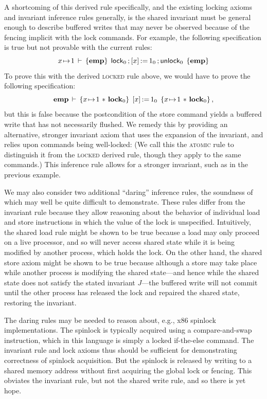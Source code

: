 \documentclass[11pt]{report}
\begin{document}
A shortcoming of this derived rule specifically, and the existing locking axioms and invariant inference rules generally, is the shared invariant must be general enough to describe buffered writes that may never be observed because of the fencing implicit with the lock commands. For example, the following specification is true but not provable with the current rules:     \[ x \!\mapsto\! 1\,\vdash\,\left\lbrace \mathbf{emp} \right\rbrace\;\operatorname{\mathsf{lock}}_0 \operatorname{;} \left[ x \right] \operatorname{:\!=} 1_0 \operatorname{;} \operatorname{\mathsf{unlock}}_0\;\left\lbrace \mathbf{emp} \right\rbrace \] To prove this with the derived \textsc{locked} rule above, we would have to prove the following specification: \[ \mathbf{emp}\,\vdash\,\left\lbrace x \!\mapsto\! 1 \operatorname{\,\ast\,} \mathbf{lock}_{0} \right\rbrace\;\left[ x \right] \operatorname{:\!=} 1_0\;\left\lbrace x \!\mapsto\! 1 \operatorname{\,\ast\,} \mathbf{lock}_{0} \right\rbrace,\] but this is false because the postcondition of the store command yields a buffered write that has not necessarily flushed. We remedy this by providing an alternative, stronger invariant axiom that uses the expansion of the invariant, and relies upon commands being well-locked:  (We call this the \textsc{atomic} rule to distinguish it from the \textsc{locked} derived rule, though they apply to the same commands.) This inference rule allows for a stronger invariant, such as in the previous example. 
 
We may also consider two additional ``daring'' inference rules, the soundness of which may well be quite difficult to demonstrate. 
These rules differ from the invariant rule because they allow reasoning about the behavior of individual load and store instructions in which the value of the lock is unspecified. Intuitively, the shared load rule might be shown to be true because a load may only proceed on a live processor, and so will never access shared state while it is being modified by another process, which holds the lock. On the other hand, the shared store axiom might be shown to be true because although a store may take place while another process is modifying the shared state---and hence while the shared state does not satisfy the stated invariant $J$---the buffered write will not commit until the other process has released the lock and repaired the shared state, restoring the invariant.

The daring rules may be needed to reason about, e.g., x86 spinlock implementations. The spinlock is typically acquired using a compare-and-swap instruction, which in this language is simply a locked if-the-else command. The invariant rule and lock axioms thus should be sufficient for demonstrating correctness of spinlock acquisition. But the spinlock is released by writing to a shared memory address without first acquiring the global lock or fencing. This obviates the invariant rule, but not the shared write rule, and so there is yet hope. 
\end{document}
